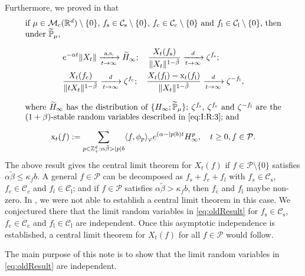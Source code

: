 \documentclass[12pt,a4paper]{amsart}
\theoremstyle{plain}
\theoremstyle{definition}
\numberwithin{equation}{section}
\begin{document}
	Furthermore, we proved in \cite[Theorem 1.6]{RenSongSunZhao2019Stable} that
\begin{equation}\label{eq:oldResult}
\begin{minipage}{0.9\textwidth}
if $\mu\in \mathcal M_\mathrm c(\mathbb R^d)\setminus \{0\}$, $f_\mathrm s\in \mathcal C_\mathrm s\setminus\{0\}$, $f_\mathrm c \in \mathcal C_\mathrm c\setminus\{0
\}$ and $f_\mathrm l \in \mathcal C_\mathrm l\setminus\{0\}$, then under $\mathbb {\widetilde P}_\mu$,
\[
\begin{split}
&e^{-\alpha t}\|X_t\| \xrightarrow[t\to \infty]{\text{a.s.}} \widetilde{H}_\infty;
\quad \frac{X_t(f_\mathrm s)}{\|X_t\|^{1-\tilde \beta}} \xrightarrow[t\to \infty]{d} \zeta^{f_\mathrm s};
\\&\frac{X_t(f_\mathrm c)}{\|t X_t\|^{1-\tilde \beta} } \xrightarrow[t\to \infty]{d} \zeta^{f_\mathrm c};
\quad\frac{X_t(f_\mathrm l) - \mathrm x_t(f_\mathrm l)}{\|X_t\|^{1-\tilde \beta}}
\xrightarrow[t\to \infty]{d}
\zeta^{-f_\mathrm l},
\end{split}
\]
where 
$\widetilde H_\infty$ has the distribution of $\{H_{\infty}; \widetilde {\mathbb P}_\mu\}$;
$\zeta^{f_\mathrm s}$, $\zeta^{f_\mathrm c}$ and $\zeta^{-f_\mathrm l}$
are the $(1+\beta)$-stable random variables described in \eqref{eq:I:R:3}; and
\[
\mathrm x_t(f) : = \sum_{p\in \mathbb Z^d_+:\alpha \tilde \beta>|p|b}\langle f,\phi_p\rangle_\varphi e^{(\alpha-|p|b)t}H^p_{\infty},\quad t\geq 0, f\in \mathcal P.
\]
\end{minipage}
\end{equation}
	The above result gives the central limit theorem for $X_t(f)$ if $f\in \mathcal P\setminus\{0\}$ satisfies $\alpha \tilde \beta \leq \kappa_f b$.
A general  $f \in \mathcal P$ can be decomposed as $f_s + f_c + f_l$ with $f_s \in \mathcal C_\mathrm s$, $f_c \in \mathcal C_\mathrm c$ and $f_l \in \mathcal C_\mathrm l$; and if $f\in  \mathcal P$ satisfies $\alpha \tilde \beta > \kappa_f b$, 
then $f_\mathrm c$ and $f_\mathrm l$ maybe non-zero.
	In \cite{RenSongSunZhao2019Stable}, we were not able to
	establish a central limit theorem in this case. We conjectured there that the limit random variables in \eqref{eq:oldResult}
	for $f_\mathrm s\in \mathcal C_\mathrm s$, $f_\mathrm c\in \mathcal C_\mathrm c$ and $f_\mathrm l\in \mathcal C_\mathrm l$ are independent.
	Once this asymptotic independence is established, a central limit theorem  for $ X_t(f)$ for all $f\in  \mathcal P$ would follow.

	The main purpose of this note is to show that
	the limit  random variables in \eqref{eq:oldResult} are independent.
\end{document}
